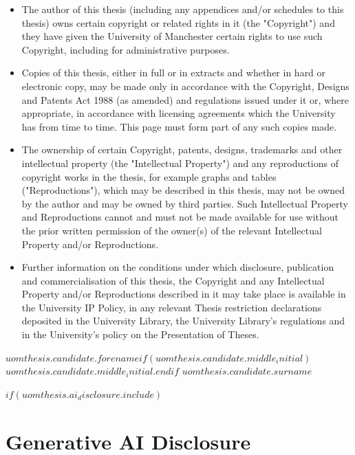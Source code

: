 \documentclass[$if(fontsize)$$fontsize$,$endif$a4paper]{report}
\begin{document}
\begin{itemize}
\item The author of this thesis (including any appendices and/or schedules to this thesis) owns certain copyright or related rights in it (the "Copyright") and they have given the University of Manchester certain rights to use such Copyright, including for administrative purposes.

\item Copies of this thesis, either in full or in extracts and whether in hard or electronic copy, may be made only in accordance with the Copyright, Designs and Patents Act 1988 (as amended) and regulations issued under it or, where appropriate, in accordance with licensing agreements which the University has from time to time. This page must form part of any such copies made.

\item The ownership of certain Copyright, patents, designs, trademarks and other intellectual property (the "Intellectual Property") and any reproductions of copyright works in the thesis, for example graphs and tables ("Reproductions"), which may be described in this thesis, may not be owned by the author and may be owned by third parties. Such Intellectual Property and Reproductions cannot and must not be made available for use without the prior written permission of the owner(s) of the relevant Intellectual Property and/or Reproductions.

\item Further information on the conditions under which disclosure, publication and commercialisation of this thesis, the Copyright and any Intellectual Property and/or Reproductions described in it may take place is available in the University IP Policy, in any relevant Thesis restriction declarations deposited in the University Library, the University Library's regulations and in the University's policy on the Presentation of Theses.
\end{itemize}

\vspace{2em}
\noindent $uomthesis.candidate.forename$$if(uomthesis.candidate.middle_initial)$ $uomthesis.candidate.middle_initial$.$endif$ $uomthesis.candidate.surname$

$if(uomthesis.ai_disclosure.include)$
\chapter*{Generative AI Disclosure}
\end{document}
